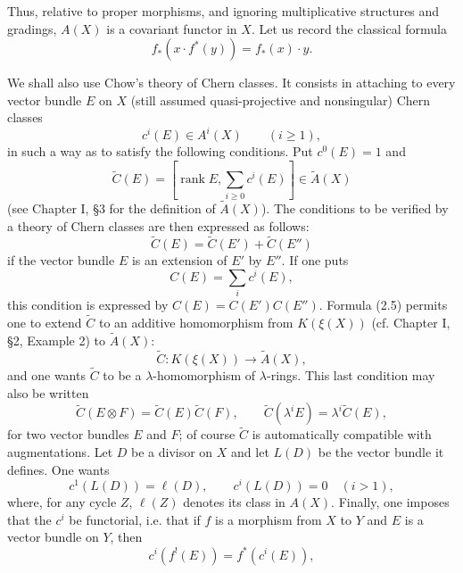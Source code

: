 \documentclass[11pt]{article}
\providecommand{\Atil}{\widetilde A}
\providecommand{\Ctil}{\widetilde C}
\providecommand{\ellc}{\ell}
\providecommand{\rank}{\operatorname{rank}}
\begin{document}
Thus, relative to proper morphisms, and ignoring multiplicative structures and gradings, $A(X)$ is a covariant functor in $X$. Let us record the classical formula
\begin{equation}\tag{2.3}
 f_*(x\cdot f^*(y))=f_*(x)\cdot y .
\end{equation}

We shall also use Chow's theory of Chern classes. It consists in attaching to every vector bundle $E$ on $X$ (still assumed quasi-projective and nonsingular) Chern classes
\[
 c^i(E)\in A^i(X)\qquad (i\geq 1),
\]
in such a way as to satisfy the following conditions. Put $c^0(E)=1$ and
\begin{equation}\tag{2.4}
 \Ctil(E)=\left[\rank E,\sum_{i\geq 0}c^i(E)\right]\in \Atil(X)
\end{equation}
(see Chapter I, \S 3 for the definition of $\Atil(X)$). The conditions to be verified by a theory of Chern classes are then expressed as follows:
\begin{equation}\tag{2.5}
 \Ctil(E)=\Ctil(E')+\Ctil(E'')
\end{equation}
if the vector bundle $E$ is an extension of $E'$ by $E''$. If one puts
\[
 C(E)=\sum_i c^i(E),
\]
this condition is expressed by $C(E)=C(E')C(E'')$. Formula (2.5) permits one to extend $\Ctil$ to an additive homomorphism from $K(\xi(X))$ (cf. Chapter I, \S 2, Example 2) to $\Atil(X)$:
\begin{equation}\tag{2.6}
 \Ctil:K(\xi(X))\longrightarrow \Atil(X),
\end{equation}
and one wants $\Ctil$ to be a $\lambda$-homomorphism of $\lambda$-rings. This last condition may also be written
\begin{equation}\tag{2.7}
 \Ctil(E\otimes F)=\Ctil(E)\Ctil(F),\qquad
 \Ctil(\lambda^iE)=\lambda^i\Ctil(E),
\end{equation}
for two vector bundles $E$ and $F$; of course $\Ctil$ is automatically compatible with augmentations. Let $D$ be a divisor on $X$ and let $L(D)$ be the vector bundle it defines. One wants
\begin{equation}\tag{2.8}
 c^1(L(D))=\ellc(D),\qquad c^i(L(D))=0\quad (i>1),
\end{equation}
where, for any cycle $Z$, $\ellc(Z)$ denotes its class in $A(X)$. Finally, one imposes that the $c^i$ be functorial, i.e. that if $f$ is a morphism from $X$ to $Y$ and $E$ is a vector bundle on $Y$, then
\begin{equation}\tag{2.9}
 c^i(f^!(E))=f^*(c^i(E)),
\end{equation}
\end{document}
